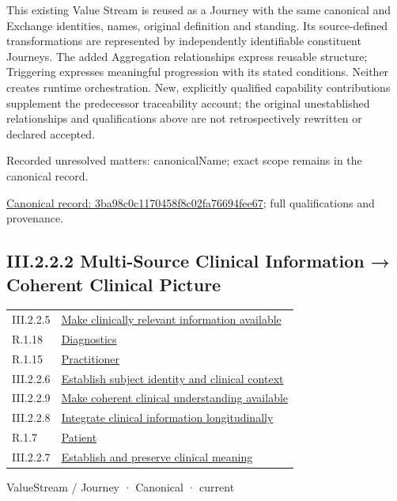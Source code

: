 This existing Value Stream is reused as a Journey with the same canonical and Exchange identities, names, original definition and standing. Its source-defined transformations are represented by independently identifiable constituent Journeys. The added Aggregation relationships express reusable structure; Triggering expresses meaningful progression with its stated conditions. Neither creates runtime orchestration. New, explicitly qualified capability contributions supplement the predecessor traceability account; the original unestablished relationships and qualifications above are not retrospectively rewritten or declared accepted.


{\small Recorded unresolved matters: canonicalName; exact scope remains in the canonical record.}\par
{\footnotesize \href{../../../../../../../continuum/strategy/value-stream/3ba98c0c1170458f8c02fa76694fee67.md}{Canonical record: 3ba98c0c1170458f8c02fa76694fee67}; full qualifications and provenance.}\par
\subsection*{III.2.2.2 Multi-Source Clinical Information → Coherent Clinical Picture}
\label{navigation:III.2.2.2}

\begin{longtable}{p{.22\linewidth}p{.73\linewidth}}
III.2.2.5 & \hyperref[element:2e20e48451b64dafa4fe7eaee2501c7a]{Make clinically relevant information available} \\
R.1.18 & \hyperref[element:46751a4e48a642a8b05831cfe4785007]{Diagnostics} \\
R.1.15 & \hyperref[element:49480591b4554983aaa82a79c1568bf3]{Practitioner} \\
III.2.2.6 & \hyperref[element:667853f4a4c343dcb559584cb08d71cf]{Establish subject identity and clinical context} \\
III.2.2.9 & \hyperref[element:75179fdde77f4c94a47756a7ae109b34]{Make coherent clinical understanding available} \\
III.2.2.8 & \hyperref[element:80b2d41cb7fc4c929cee667353caa411]{Integrate clinical information longitudinally} \\
R.1.7 & \hyperref[element:5f6d333e94634420b8a8bbf8b9cb6e2a]{Patient} \\
III.2.2.7 & \hyperref[element:e64c4ed500d84f0fa84a12646ea8b98d]{Establish and preserve clinical meaning} \\
\end{longtable}
\label{element:01f655eae3d8485699449c3dcf4f9b56}
{\small ValueStream / Journey · Canonical · current}\par

